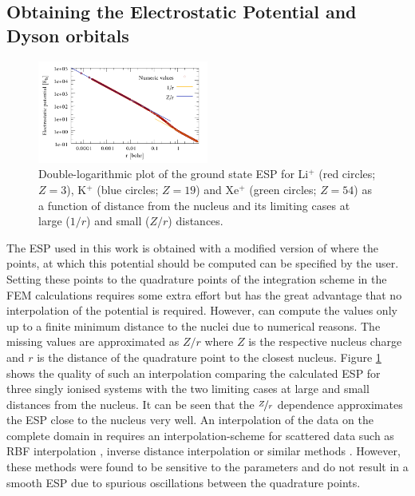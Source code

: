 \subsection{Obtaining the Electrostatic Potential and Dyson orbitals}
\begin{figure}
\includegraphics[width=0.5\textwidth]{Figures/ESP}
\caption{Double-logarithmic plot of the ground state ESP for Li$^+$ (red circles; $Z=3$), K$^+$ (blue circles; $Z=19$) and Xe$^+$ (green circles; $Z=54$) as a function of distance from the nucleus and its limiting cases at large ($1/r$) and small ($Z/r$) distances.}
\label{fig:esp}
\end{figure}
The ESP used in this work is obtained with a modified version of  \cite{nwchem} where the points, at which this potential should be computed can be specified by the user.
Setting these points to the quadrature points of the integration scheme in the FEM calculations requires some extra effort but has the great advantage that no interpolation of the potential is required.
However,  can compute the values only up to a finite minimum distance to the nuclei due to numerical reasons.
The missing values are approximated as $Z/r$ where $Z$ is the respective nucleus charge and $r$ is the distance of the quadrature point to the closest nucleus.
Figure \ref{fig:esp} shows the quality of such an interpolation comparing the calculated ESP for three singly ionised systems with the two limiting cases at large and small distances from the nucleus.
It can be seen that the $\nicefrac{Z}{r}$ dependence approximates the ESP close to the nucleus very well.
An interpolation of the data on the complete domain in  \cite{FreeWilly} requires an interpolation-scheme for scattered data such as RBF interpolation \cite{rbfSE,rbfInterpol,rbfSurf}, inverse distance interpolation \cite{adapt_idw,idw} or similar methods \cite{CompInterp,idw_krieging,interpol}.
However, these methods were found to be sensitive to the parameters and do not result in a smooth ESP due to spurious oscillations between the quadrature points.

